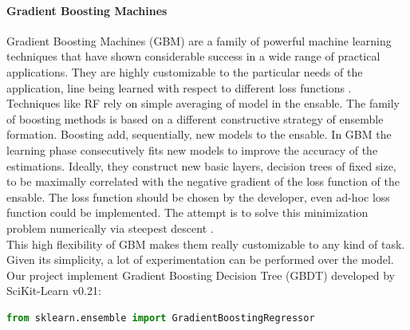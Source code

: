 \documentclass[%
    corpo=12pt,
    twoside,
    oldstyle,
    autoretitolo,
    greek,
    evenboxes,
]{toptesi}
\begin{document}
\paragraph{Gradient Boosting Machines}
Gradient Boosting Machines (GBM) are a family of powerful machine learning techniques that have shown considerable success in a wide range of practical applications. They are highly customizable to the particular needs of the application, line being learned with respect to different loss functions \cite{gbm}. Techniques like RF rely on simple averaging of model in the ensable. The family of boosting methods is based on a different constructive strategy of ensemble formation. Boosting add, sequentially, new models to the ensable. In GBM the learning phase consecutively fits new models to improve the accuracy of the estimations. Ideally, they construct new basic layers,  decision trees of fixed size, to be maximally correlated with the negative gradient of the loss function of the ensable. The loss function should be chosen by the developer, even ad-hoc loss function could be implemented. The attempt is to solve this minimization problem numerically via steepest descent \cite{ensable}.\\
This high flexibility of GBM makes them really customizable to any kind of task. Given its simplicity, a lot of experimentation can be performed over the model.\\
Our project implement Gradient Boosting Decision Tree (GBDT) developed by SciKit-Learn v0.21:
\begin{lstlisting}[language=Python, frame=single]
  from sklearn.ensemble import GradientBoostingRegressor
\end{lstlisting}
\end{document}
